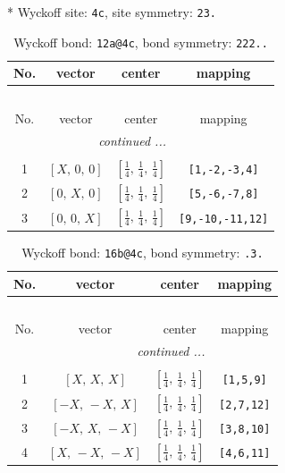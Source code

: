 \documentclass[fleqn,8pt]{jsarticle}
\begin{document}
* Wyckoff site: {\tt 4c}, site symmetry: {\tt 23.}
\renewcommand{\arraystretch}{1.2}
\begin{longtable}{cccc}
\caption{Wyckoff bond: {\tt 12a@4c}, bond symmetry: {\tt 222..}}
 \\
 \hline \hline
No. & vector & center & mapping \\ \hline \endfirsthead

\multicolumn{3}{l}{\tablename\ \thetable{}} \\
 \hline \hline
No. & vector & center & mapping \\ \hline \endhead

 \hline \hline
\multicolumn{3}{r}{\footnotesize\it continued ...} \\ \endfoot

 \hline \hline
\multicolumn{3}{r}{} \\ \endlastfoot

1 & $\left[ X,\, 0,\, 0 \right]$ & $\left[ \frac{1}{4},\, \frac{1}{4},\, \frac{1}{4} \right]$ & {\tt [1,-2,-3,4]} \\ \hline
2 & $\left[ 0,\, X,\, 0 \right]$ & $\left[ \frac{1}{4},\, \frac{1}{4},\, \frac{1}{4} \right]$ & {\tt [5,-6,-7,8]} \\ \hline
3 & $\left[ 0,\, 0,\, X \right]$ & $\left[ \frac{1}{4},\, \frac{1}{4},\, \frac{1}{4} \right]$ & {\tt [9,-10,-11,12]} \\
\end{longtable}
\renewcommand{\arraystretch}{1.2}
\begin{longtable}{cccc}
\caption{Wyckoff bond: {\tt 16b@4c}, bond symmetry: {\tt .3.}}
 \\
 \hline \hline
No. & vector & center & mapping \\ \hline \endfirsthead

\multicolumn{3}{l}{\tablename\ \thetable{}} \\
 \hline \hline
No. & vector & center & mapping \\ \hline \endhead

 \hline \hline
\multicolumn{3}{r}{\footnotesize\it continued ...} \\ \endfoot

 \hline \hline
\multicolumn{3}{r}{} \\ \endlastfoot

1 & $\left[ X,\, X,\, X \right]$ & $\left[ \frac{1}{4},\, \frac{1}{4},\, \frac{1}{4} \right]$ & {\tt [1,5,9]} \\ \hline
2 & $\left[ - X,\, - X,\, X \right]$ & $\left[ \frac{1}{4},\, \frac{1}{4},\, \frac{1}{4} \right]$ & {\tt [2,7,12]} \\ \hline
3 & $\left[ - X,\, X,\, - X \right]$ & $\left[ \frac{1}{4},\, \frac{1}{4},\, \frac{1}{4} \right]$ & {\tt [3,8,10]} \\ \hline
4 & $\left[ X,\, - X,\, - X \right]$ & $\left[ \frac{1}{4},\, \frac{1}{4},\, \frac{1}{4} \right]$ & {\tt [4,6,11]} \\
\end{longtable}
\end{document}
